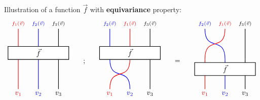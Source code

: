 Illustration of a function $\vec{f}$ with \textbf{equivariance} property:
\begin{equation}
\begin{tikzpicture}[every path/.style={thick}]
\node[red,above] (x0) at (0, 3) {${\scriptstyle f_1(\vec{v})}$};
\node[blue,above] (x1) at (1, 3) {${\scriptstyle f_2(\vec{v})}$};
\node[above] (x2) at (2, 3) {${\scriptstyle f_3(\vec{v})}$};
\node[] (z0) at (0, 1.5) {};
\node[] (z1) at (1, 1.5) {};
\node[] (z2) at (2, 1.5) {};
\node[red,below] (v0) at (0, 0) {$v_1$};
\node[blue,below] (v1) at (1, 0) {$v_2$};
\node[below] (v2) at (2, 0) {$v_3$};
\draw[red] (x0) to (z0.center);
\draw[blue] (x1) to (z1.center);
\draw (x2) to (z2.center);
\draw[red] (z0.center) to (v0);
\draw[blue] (z1.center) to (v1);
\draw (z2.center) to (v2);
\node[inner xsep=40pt,draw,in front of path,fill=white] (f) at (1,1.8) {$\vec{f}$};
\end{tikzpicture}
\qquad \raisebox{5em}{;} \qquad
\begin{tikzpicture}[every path/.style={thick}]
\node[blue,above] (x0) at (0, 3) {${\scriptstyle f_2(\vec{v})}$};
\node[red,above] (x1) at (1, 3) {${\scriptstyle f_1(\vec{v})}$};
\node[above] (x2) at (2, 3) {${\scriptstyle f_3(\vec{v})}$};
\node[] (z0) at (0, 1.5) {};
\node[] (z1) at (1, 1.5) {};
\node[] (z2) at (2, 1.5) {};
\node[red,below] (v0) at (0, 0) {$v_1$};
\node[blue,below] (v1) at (1, 0) {$v_2$};
\node[below] (v2) at (2, 0) {$v_3$};
\draw[blue] (x0) to (z0.center);
\draw[red] (x1) to (z1.center);
\draw (x2) to (z2.center);
\draw[blue] (z0.center) .. controls (0,0.3) and (1,1.2) .. (v1);
\draw[red] (z1.center) .. controls (1,0.3) and (0,1.2) .. (v0);
\draw (z2.center) to (v2);
\node[inner xsep=40pt,draw,in front of path,fill=white] (f) at (1,1.8) {$\vec{f}$};
\end{tikzpicture}
\qquad \raisebox{5em}{=} \qquad
\begin{tikzpicture}[every path/.style={thick}]
\node[blue,above] (x0) at (0, 3) {${\scriptstyle f_2(\vec{v})}$};
\node[red,above] (x1) at (1, 3) {${\scriptstyle f_1(\vec{v})}$};
\node[above] (x2) at (2, 3) {${\scriptstyle f_3(\vec{v})}$};
\node[] (z0) at (0, 1.5) {};
\node[] (z1) at (1, 1.5) {};
\node[] (z2) at (2, 1.5) {};
\node[red,below] (v0) at (0, 0) {$v_1$};
\node[blue,below] (v1) at (1, 0) {$v_2$};
\node[below] (v2) at (2, 0) {$v_3$};
\draw[blue] (x0) .. controls (0,1.8) and (1,2.7) .. (z1.center);
\draw[red] (x1) .. controls (1,1.8) and (0,2.7) .. (z0.center);
\draw (x2) to (z2.center);
\draw[red] (z0.center) to (v0);
\draw[blue] (z1.center) to (v1);
\draw (z2.center) to (v2);
\node[inner xsep=40pt,draw,in front of path,fill=white] (f) at (1,1) {$\vec{f}$};
\end{tikzpicture}
\end{equation}

